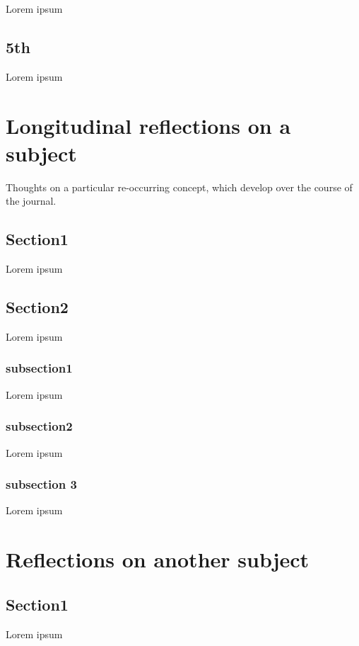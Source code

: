 \documentclass[a4paper,12pt]{memoir}
\begin{document}
Lorem ipsum

\section{5th}

Lorem ipsum

\appendix

\chapter{Longitudinal reflections on a subject}

Thoughts on a particular re-occurring concept, which develop over the course of the journal.

\section{Section1}

Lorem ipsum

\section{Section2}

Lorem ipsum

\subsection{subsection1}

Lorem ipsum

\subsection{subsection2}

Lorem ipsum

\subsection{subsection 3}

Lorem ipsum

\chapter{Reflections on another subject}

\section{Section1}

Lorem ipsum


\backmatter %

	
\end{document}
